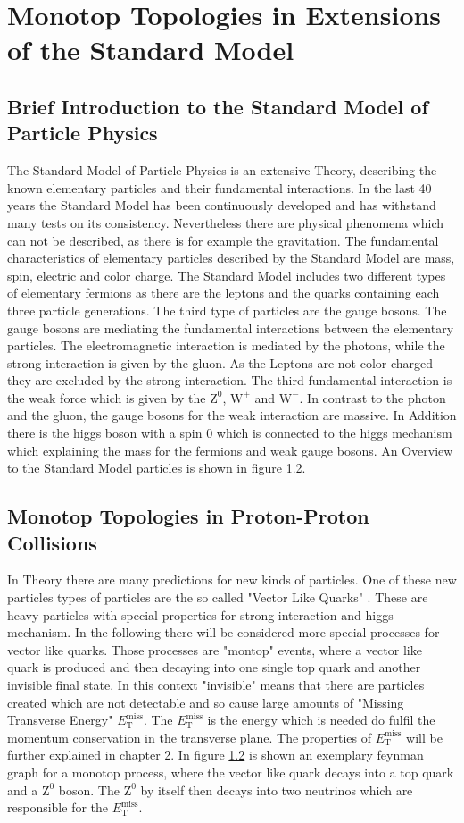 \chapter{Monotop Topologies in Extensions of the Standard Model}

\section{Brief Introduction to the Standard Model of Particle Physics}
The Standard Model of Particle Physics is an extensive Theory, describing the known elementary particles and their fundamental interactions.
In the last 40 years the Standard Model has been continuously developed and has withstand many tests on its consistency.
Nevertheless there are physical phenomena which can not be described, as there is for example the gravitation.
The fundamental characteristics of elementary particles described by the Standard Model are mass, spin, electric and color charge.
The Standard Model includes two different types of elementary fermions as there are the leptons and the quarks containing each three particle generations.
The third type of particles are the gauge bosons.
The gauge bosons are mediating the fundamental interactions between the elementary particles.
The electromagnetic interaction is mediated by the photons, while the strong interaction is given by the gluon.
As the Leptons are not color charged they are excluded by the strong interaction.
The third fundamental interaction is the weak force which is given by the $\mathrm{Z^0}$, $\mathrm{W^+}$ and $\mathrm{W^-}$.
In contrast to the photon and the gluon, the gauge bosons for the weak interaction are massive.
In Addition there is the higgs boson with a spin 0 which is connected to the higgs mechanism which explaining the mass for the fermions and weak gauge bosons.
An Overview to the Standard Model particles is shown in figure \ref{}.

\section{Monotop Topologies in Proton-Proton Collisions}

In Theory there are many predictions for new kinds of particles.
One of these new particles types of particles are the so called "Vector Like Quarks" .
These are heavy particles with special properties for strong interaction and higgs mechanism.
In the following there will be considered more special processes for vector like quarks.
Those processes are "montop" events, where a vector like quark is produced and then decaying into one single top quark and another invisible final state.
In this context "invisible" means that there are particles created which are not detectable and so cause large amounts of "Missing Transverse Energy" $E_{\text{T}}^{\text{miss}}$.
The $E_{\text{T}}^{\text{miss}}$ is the energy which is needed do fulfil the momentum conservation in the transverse plane.
The properties of $E_{\text{T}}^{\text{miss}}$ will be further explained in chapter 2.
In figure \ref{} is shown an exemplary feynman graph for a monotop process, where the vector like quark decays into a top quark and a $\mathrm{Z^0}$ boson.
The $\mathrm{Z^0}$ by itself then decays into two neutrinos which are responsible for the  $E_{\text{T}}^{\text{miss}}$.
